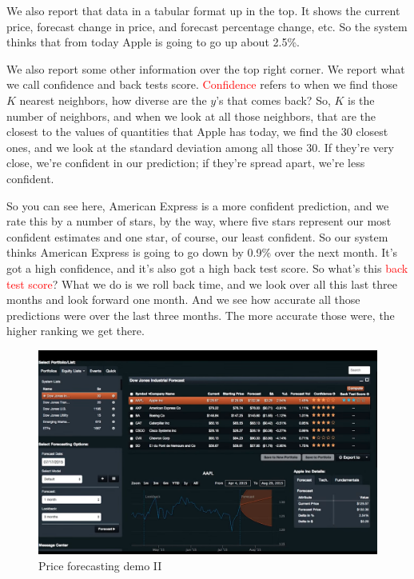 \documentclass[12pt]{article}
\begin{document}
We also report that data in a tabular format up in the top. It shows the current price, forecast change in price, and forecast percentage change, etc. So the system thinks that from today Apple is going to go up about 2.5\%. 

We also report some other information over the top right corner. We report what we call confidence and back tests score. \textcolor{red}{Confidence} refers to when we find those $K$ nearest neighbors, how diverse are the $y$'s that comes back? So, $K$ is the number of neighbors, and when we look at all those neighbors, that are the closest to the values of quantities that Apple has today, we find the 30 closest ones, and we look at the standard deviation among all those 30. If they're very close, we're confident in our prediction; if they're spread apart, we're less confident. 

So you can see here, American Express is a more confident prediction, and we rate this by a number of stars, by the way, where five stars represent our most confident estimates and one star, of course, our least confident. So our system thinks American Express is going to go down by 0.9\% over the next month. It's got a high confidence, and it's also got a high back test score. So what's this \textcolor{red}{back test score}? What we do is we roll back time, and we look over all this last three months and look forward one month. And we see how accurate all those predictions were over the last three months. The more accurate those were, the higher ranking we get there.  

\begin{figure}[!ht]
\centering
\includegraphics[scale=0.35]{fig/fig76}
\caption{Price forecasting demo II}
\end{figure}
\end{document}
